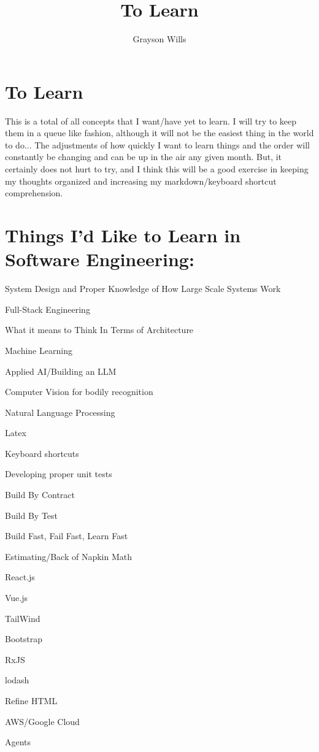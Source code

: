 \documentclass[12pt]{article}
\title{To Learn}
\author{Grayson Wills}
\begin{document}
\maketitle
\section*{To Learn}
This is a total of all concepts that I want/have yet to learn. I will try to keep them in a queue like fashion, although it will not be the easiest thing in the world to do... The adjustments of how quickly I want to learn things and the order will constantly be changing and can be up in the air any given month. But, it certainly does not hurt to try, and I think this will be a good exercise in keeping my thoughts organized and increasing my markdown/keyboard shortcut comprehension.

\section*{Things I'd Like to Learn in Software Engineering:}
\begin{description}
    \item System Design and Proper Knowledge of How Large Scale Systems Work
    \item Full-Stack Engineering
    \item What it means to Think In Terms of Architecture
    \item Machine Learning
    \item Applied AI/Building an LLM
    \item Computer Vision for bodily recognition
    \item Natural Language Processing
    \item Latex
    \item Keyboard shortcuts
    \item Developing proper unit tests
    \item Build By Contract
    \item Build By Test
    \item Build Fast, Fail Fast, Learn Fast
    \item Estimating/Back of Napkin Math
    \item React.js
    \item Vue.js
    \item TailWind
    \item Bootstrap
    \item RxJS
    \item lodash
    \item Refine HTML
    \item AWS/Google Cloud
    \item Agents
\end{description}
\end{document}
